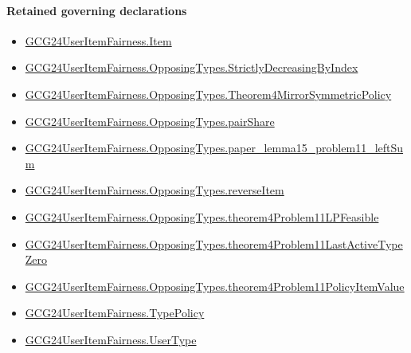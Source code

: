 \documentclass[10pt]{article}
\begin{document}
\paragraph{Retained governing declarations}
\begin{itemize}\raggedright
\item \hyperlink{governing-declaration-a7c560a429c6e204}{GCG24\allowbreak{}User\allowbreak{}Item\allowbreak{}Fairness.\allowbreak{}Item}
\item \hyperlink{governing-declaration-8278344d2ddef9a8}{GCG24\allowbreak{}User\allowbreak{}Item\allowbreak{}Fairness.\allowbreak{}Opposing\allowbreak{}Types.\allowbreak{}Strictly\allowbreak{}Decreasing\allowbreak{}By\allowbreak{}Index}
\item \hyperlink{governing-declaration-00d15cf288402d6b}{GCG24\allowbreak{}User\allowbreak{}Item\allowbreak{}Fairness.\allowbreak{}Opposing\allowbreak{}Types.\allowbreak{}Theorem4\allowbreak{}Mirror\allowbreak{}Symmetric\allowbreak{}Policy}
\item \hyperlink{governing-declaration-1663e30d856ccba9}{GCG24\allowbreak{}User\allowbreak{}Item\allowbreak{}Fairness.\allowbreak{}Opposing\allowbreak{}Types.\allowbreak{}pair\allowbreak{}Share}
\item \hyperlink{governing-declaration-be96a6c58acb2803}{GCG24\allowbreak{}User\allowbreak{}Item\allowbreak{}Fairness.\allowbreak{}Opposing\allowbreak{}Types.\allowbreak{}paper\_\allowbreak{}lemma15\_\allowbreak{}problem11\_\allowbreak{}left\allowbreak{}Sum}
\item \hyperlink{governing-declaration-c12a8e29d370ae70}{GCG24\allowbreak{}User\allowbreak{}Item\allowbreak{}Fairness.\allowbreak{}Opposing\allowbreak{}Types.\allowbreak{}reverse\allowbreak{}Item}
\item \hyperlink{governing-declaration-8c4140d04ab0e31c}{GCG24\allowbreak{}User\allowbreak{}Item\allowbreak{}Fairness.\allowbreak{}Opposing\allowbreak{}Types.\allowbreak{}theorem4\allowbreak{}Problem11\allowbreak{}LP\allowbreak{}Feasible}
\item \hyperlink{governing-declaration-4079ef2267e358f9}{GCG24\allowbreak{}User\allowbreak{}Item\allowbreak{}Fairness.\allowbreak{}Opposing\allowbreak{}Types.\allowbreak{}theorem4\allowbreak{}Problem11\allowbreak{}Last\allowbreak{}Active\allowbreak{}Type\allowbreak{}Zero}
\item \hyperlink{governing-declaration-9dd6ffc03d249aa8}{GCG24\allowbreak{}User\allowbreak{}Item\allowbreak{}Fairness.\allowbreak{}Opposing\allowbreak{}Types.\allowbreak{}theorem4\allowbreak{}Problem11\allowbreak{}Policy\allowbreak{}Item\allowbreak{}Value}
\item \hyperlink{governing-declaration-dc7776cb642fa9dc}{GCG24\allowbreak{}User\allowbreak{}Item\allowbreak{}Fairness.\allowbreak{}Type\allowbreak{}Policy}
\item \hyperlink{governing-declaration-fd2c25ccc96ab645}{GCG24\allowbreak{}User\allowbreak{}Item\allowbreak{}Fairness.\allowbreak{}User\allowbreak{}Type}
\end{itemize}
\end{document}
